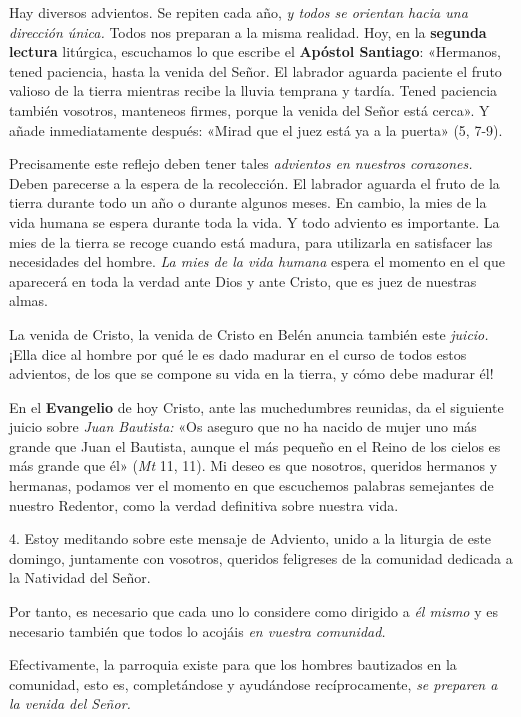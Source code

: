 \begin{body}
\begin{body}
Hay diversos advientos. Se repiten cada año, \emph{y todos se orientan
	hacia una dirección única.} Todos nos preparan a la misma realidad. Hoy,
en la \textbf{segunda lectura} litúrgica, escuchamos lo que escribe el
\textbf{Apóstol Santiago}: «Hermanos, tened paciencia, hasta la venida
del Señor. El labrador aguarda paciente el fruto valioso de la tierra
mientras recibe la lluvia temprana y tardía. Tened paciencia también
vosotros, manteneos firmes, porque la venida del Señor está cerca». Y
añade inmediatamente después: «Mirad que el juez está ya a la puerta»
(5, 7-9).

Precisamente este reflejo deben tener tales \emph{advientos en nuestros
	corazones.} Deben parecerse a la espera de la recolección. El labrador
aguarda el fruto de la tierra durante todo un año o durante algunos
meses. En cambio, la mies de la vida humana se espera durante toda la
vida. Y todo adviento es importante. La mies de la tierra se recoge
cuando está madura, para utilizarla en satisfacer las necesidades del
hombre. \emph{La mies de la vida humana} espera el momento en el que
aparecerá en toda la verdad ante Dios y ante Cristo, que es juez de
nuestras almas.

La venida de Cristo, la venida de Cristo en Belén anuncia también este
\emph{juicio.} ¡Ella dice al hombre por qué le es dado madurar en el
curso de todos estos advientos, de los que se compone su vida en la
tierra, y cómo debe madurar él!

En el \textbf{Evangelio} de hoy Cristo, ante las muchedumbres reunidas,
da el siguiente juicio sobre \emph{Juan Bautista:} «Os aseguro que no ha
nacido de mujer uno más grande que Juan el Bautista, aunque el más
pequeño en el Reino de los cielos es más grande que él» (\emph{Mt} 11,
11). Mi deseo es que nosotros, queridos hermanos y hermanas, podamos ver
el momento en que escuchemos palabras semejantes de nuestro Redentor,
como la verdad definitiva sobre nuestra vida.

4. Estoy meditando sobre este mensaje de Adviento, unido a la liturgia
de este domingo, juntamente con vosotros, queridos feligreses de la
comunidad dedicada a la Natividad del Señor.

Por tanto, es necesario que cada uno lo considere como dirigido a
\emph{él mismo} y es necesario también que todos lo acojáis \emph{en
	vuestra comunidad.}

Efectivamente, la parroquia existe para que los hombres bautizados en la
comunidad, esto es, completándose y ayudándose recíprocamente, \emph{se
	preparen a la venida del Señor.}


\end{body}
\end{body}
